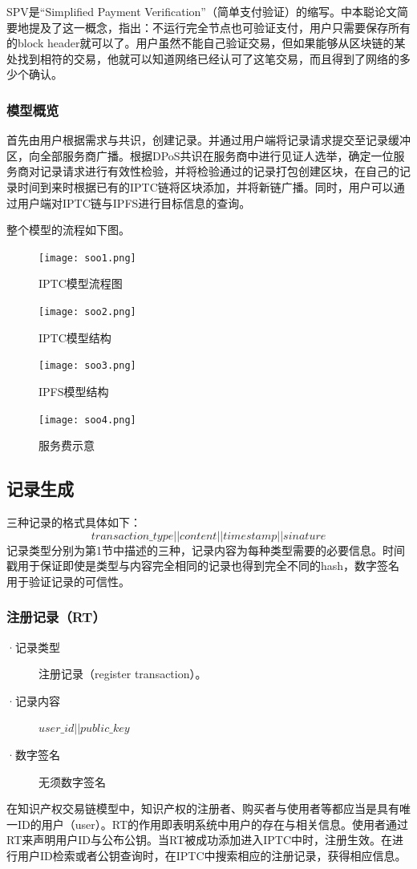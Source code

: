\documentclass[withoutpreface,bwprint]{cumcmthesis} %
\begin{document}
SPV是“Simplified Payment Verification”（简单支付验证）的缩写。中本聪论文简要地提及了这一概念，指出：不运行完全节点也可验证支付，用户只需要保存所有的block header就可以了。用户虽然不能自己验证交易，但如果能够从区块链的某处找到相符的交易，他就可以知道网络已经认可了这笔交易，而且得到了网络的多少个确认。

\subsubsection{模型概览}
首先由用户根据需求与共识，创建记录。并通过用户端将记录请求提交至记录缓冲区，向全部服务商广播。根据DPoS共识在服务商中进行见证人选举，确定一位服务商对记录请求进行有效性检验，并将检验通过的记录打包创建区块，在自己的记录时间到来时根据已有的IPTC链将区块添加，并将新链广播。同时，用户可以通过用户端对IPTC链与IPFS进行目标信息的查询。

整个模型的流程如下图。
\begin{figure}[h]
	\centering
	\texttt{[image: soo1.png]}
	\caption{IPTC模型流程图}
\end{figure}
\begin{figure}[h]
	\centering
	\texttt{[image: soo2.png]}
	\caption{IPTC模型结构}
\end{figure}
\begin{figure}[h]
	\centering
	\texttt{[image: soo3.png]}
	\caption{IPFS模型结构}
\end{figure}
\begin{figure}[h]
	\centering
	\texttt{[image: soo4.png]}
	\caption{服务费示意}
\end{figure}

\subsection{记录生成}
三种记录的格式具体如下：
\[transaction\_type||content||timestamp||sinature\]
记录类型分别为第1节中描述的三种，记录内容为每种类型需要的必要信息。时间戳用于保证即使是类型与内容完全相同的记录也得到完全不同的hash，数字签名用于验证记录的可信性。

\subsubsection{注册记录（RT）}
\begin{description}
	\item[·记录类型] 注册记录（register transaction）。
	\item[·记录内容] $user\_id || public\_key$
	\item[·数字签名] 无须数字签名
\end{description}
在知识产权交易链模型中，知识产权的注册者、购买者与使用者等都应当是具有唯一ID的用户（user）。RT的作用即表明系统中用户的存在与相关信息。使用者通过RT来声明用户ID与公布公钥。当RT被成功添加进入IPTC中时，注册生效。在进行用户ID检索或者公钥查询时，在IPTC中搜索相应的注册记录，获得相应信息。
\end{document}
